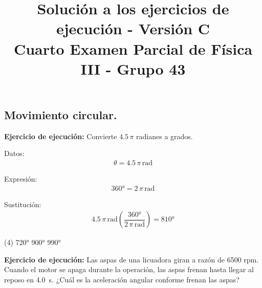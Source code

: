 \documentclass[12pt, letter]{exam}
\date{}
\title{Solución a los ejercicios de ejecución - Versión C \\ Cuarto Examen Parcial de Física III - Grupo 43}
\begin{document}
\maketitle

\setcounter{page}{2}

\begin{questions}
    \section{Movimiento circular.}

    \setcounter{question}{4} \question \textbf{Ejercicio de ejecución: } Convierte $4.5 \, \pi$ radianes a grados.

    \begin{minipage}[t]{0.35\linewidth}
    Datos: 
    \begin{align*}
    \theta = 4.5 \, \pi \, \unit{\radian}
    \end{align*}
    \end{minipage}
    \hspace{1cm}
    \begin{minipage}[t]{0.4\linewidth}
    Expresión:
    \begin{align*}
    \ang{360} = 2 \, \pi \, \unit{\radian}
    \end{align*}
    \end{minipage}

    Sustitución:
    \begin{align*}
    4.5 \, \pi \, \unit{\radian} \left( \dfrac{\ang{360}}{2 \, \pi \, \unit{\radian}} \right) = \ang{810}
    \end{align*}

    \vspace{0.3cm}
    \begin{tasks}(4)
        \task \ang{720}
        \task {}
        \task \ang{900}
        \task \ang{990}
    \end{tasks}

    \question \label{Ejercicio_02} \textbf{Ejercicio de ejecución: } Las aspas de una licuadora giran a razón de \num{6500} rpm. Cuando el motor se apaga durante la operación, las aspas frenan hasta llegar al reposo en \SI{4.0}{\second}. ¿Cuál es la aceleración angular conforme frenan las aspas?
    

\end{questions}
\end{document}
